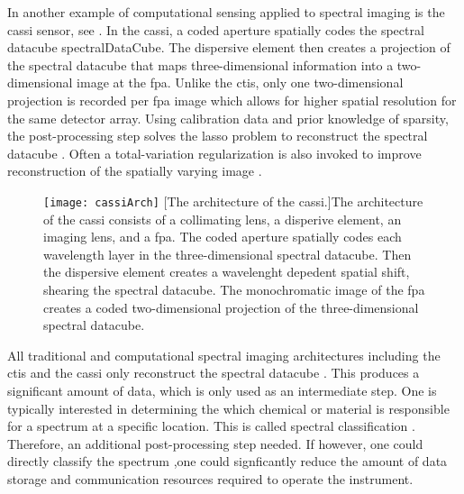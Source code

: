 In another example of computational sensing applied to spectral imaging is the \acrfull{cassi} sensor, see . In the \gls{cassi}, a coded aperture spatially codes the spectral datacube \gls{spectralDataCube}. The dispersive element then creates a projection of the spectral datacube that maps three-dimensional information into a two-dimensional image at the \gls{fpa}. Unlike the \gls{ctis}, only one two-dimensional projection is recorded per \gls{fpa} image which allows for higher spatial resolution for the same detector array. Using calibration data and prior knowledge of sparsity, the post-processing step solves the \gls{lasso} problem to reconstruct the spectral datacube \cite{wagadarikar2008single, arce2014compressive}. Often a total-variation regularization is also invoked to improve reconstruction of the spatially varying image \cite{wagadarikar2008spectral, bioucas2007new}.


\begin{figure}
	\texttt{[image: cassiArch]}
	[The architecture of the \acrfull{cassi}.]{The architecture of the \acrfull{cassi} consists of a collimating lens, a disperive element, an imaging lens, and a \acrfull{fpa}. The coded aperture spatially codes each wavelength layer in the three-dimensional spectral datacube. Then the dispersive element creates a wavelenght depedent spatial shift, shearing the spectral datacube. The monochromatic image of the \gls{fpa} creates a coded two-dimensional projection of the three-dimensional spectral datacube.}
	\label{fig:cassiArch}
\end{figure}


All traditional and computational spectral imaging architectures including the \gls{ctis} and the \gls{cassi} only reconstruct the spectral datacube \cite{hagen2013review}. This produces a significant amount of data, which is only used as an intermediate step. One is typically interested in determining the which chemical or material is responsible for a spectrum at a specific location. This is called spectral classification \cite{chang2003hyperspectral, dupont2011spatial, liu2014discriminative}. Therefore, an additional post-processing step needed. If however, one could directly classify the spectrum ,one could signficantly reduce the amount of data storage and communication resources required to operate the instrument. 

